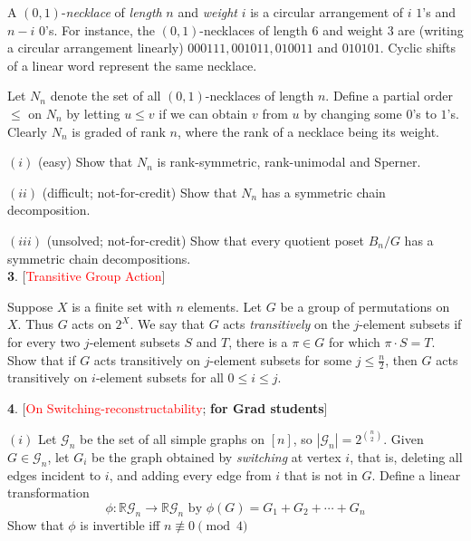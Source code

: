 \documentclass[10pt]{article}
\begin{document}
A $(0,1)$-\emph{necklace} of \emph{length} $n$ and \emph{weight} $i$ is a circular arrangement of $i$ $1$'s and $n-i$ $0$'s. For instance, the $(0,1)$-necklaces of length $6$ and weight $3$ are (writing a circular arrangement linearly) $000111, 001011, 010011$ and $010101$. Cyclic shifts of a linear word represent the same necklace.\smallskip

Let $N_n$ denote the set of all $(0,1)$-necklaces of length $n$. Define a partial order $\le$ on $N_n$ by letting $u\le v$ if we can obtain $v$ from $u$ by changing some $0$'s to $1$'s. Clearly $N_n$ is graded of rank $n$, where the rank of a necklace being its weight.\medskip

$(i)$ (easy) Show that $N_n$ is rank-symmetric, rank-unimodal and Sperner.\smallskip

$(ii)$ (difficult; not-for-credit) Show that $N_n$ has a symmetric chain decomposition.\medskip

$(iii)$ (unsolved; not-for-credit) Show that every quotient poset $B_n/G$ has a symmetric chain decompositions.\\

\textbf{3}. [\textcolor{red}{Transitive Group Action}]\smallskip

Suppose $X$ is a finite set with $n$ elements. Let $G$ be a group of permutations on $X$. Thus $G$ acts on $2^{X}$. We say that $G$ acts \emph{transitively} on the $j$-element subsets if for every two $j$-element subsets $S$ and $T$, there is a $\pi \in G$ for which $\pi\cdot S=T$. Show that if $G$ acts transitively on $j$-element subsets for some $j\le \frac{n}{2}$, then $G$ acts transitively on $i$-element subsets for all $0\le i\le j$.\pagebreak %

\textbf{4}. [\textcolor{red}{On Switching-reconstructability}; \textbf{for Grad students}]\smallskip

$(i)$ Let $\mathcal{G}_n$ be the set of all simple graphs on $[n]$, so $|\mathcal{G}_n|=2^{\binom{n}{2}}$. Given $G\in \mathcal{G}_n$, let $G_i$ be the graph obtained by \emph{switching} at vertex $i$, that is, deleting all edges incident to $i$, and adding every edge from $i$ that is not in $G$. Define a linear transformation $$\phi: \mathbb{R}\mathcal{G}_n\rightarrow \mathbb{R}\mathcal{G}_n\,\, \text{by}\,\, \phi(G)=G_1+G_2+\cdots+G_n$$ Show that $\phi$ is invertible iff $n\not\equiv 0 \pmod 4$\medskip
\end{document}
